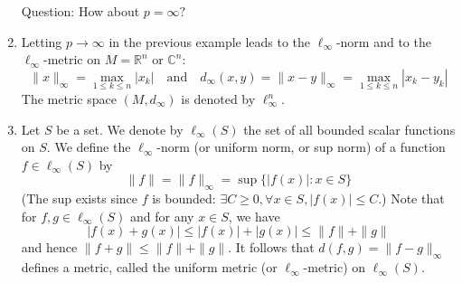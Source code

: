\documentclass[a4paper,11pt]{article}
\begin{document}
\begin{example}
\begin{enumerate}
        Question: How about $p=\infty ?$
        \item Letting $p \rightarrow \infty$ in the previous example leads to the $\ell_{\infty}$-norm and to the $\ell_{\infty}$-metric on $M=\mathbb{R}^{n}$ or $\mathbb{C}^{n}:$
        \[
        \|x\|_{\infty}=\max _{1 \leqslant k \leqslant n}\left|x_{k}\right|\quad \text {and}\quad d_{\infty}(x, y)=\|x-y\|_{\infty}=\max _{1 \leqslant k \leqslant n}\left|x_{k}-y_{k}\right|
        \]
        The metric space $\left(M, d_{\infty}\right)$ is denoted by $\ell_{\infty}^{n}$.
        \item Let $S$ be a set. We denote by $\ell_{\infty}(S)$ the set of all bounded scalar functions on $S$. We define the $\ell_{\infty}$-norm (or uniform norm, or sup norm) of a function $f \in \ell_{\infty}(S)$ by
        \[
        \|f\|=\|f\|_{\infty}=\sup \{|f(x)|: x \in S\}
        \]
        (The sup exists since $f$ is bounded: $\exists C \geqslant 0, \forall x \in S,|f(x)| \leqslant C$.) Note that for $f, g \in \ell_{\infty}(S)$ and for any $x \in S$, we have
        \[
        |f(x)+g(x)| \leqslant|f(x)|+|g(x)| \leqslant\|f\|+\|g\|
        \]
        and hence $\|f+g\| \leqslant\|f\|+\|g\|$. It follows that $d(f, g)=\|f-g\|_{\infty}$ defines a metric, called the uniform metric (or $\ell_{\infty}$-metric) on $\ell_{\infty}(S)$.
        

\end{enumerate}
\end{example}
\end{document}
